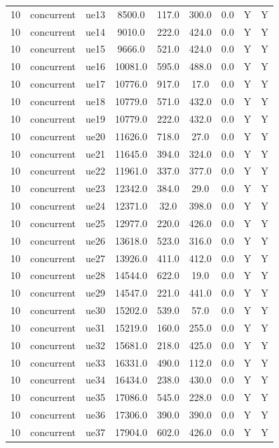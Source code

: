 \begin{table}[ht]
\begin{tabular}{|c|c|c|c|c|c|c|c|c|}
10 & concurrent & ue13 & 8500.0 & 117.0 & 300.0 & 0.0 & Y & Y \\
10 & concurrent & ue14 & 9010.0 & 222.0 & 424.0 & 0.0 & Y & Y \\
10 & concurrent & ue15 & 9666.0 & 521.0 & 424.0 & 0.0 & Y & Y \\
10 & concurrent & ue16 & 10081.0 & 595.0 & 488.0 & 0.0 & Y & Y \\
10 & concurrent & ue17 & 10776.0 & 917.0 & 17.0 & 0.0 & Y & Y \\
10 & concurrent & ue18 & 10779.0 & 571.0 & 432.0 & 0.0 & Y & Y \\
10 & concurrent & ue19 & 10779.0 & 222.0 & 432.0 & 0.0 & Y & Y \\
10 & concurrent & ue20 & 11626.0 & 718.0 & 27.0 & 0.0 & Y & Y \\
10 & concurrent & ue21 & 11645.0 & 394.0 & 324.0 & 0.0 & Y & Y \\
10 & concurrent & ue22 & 11961.0 & 337.0 & 377.0 & 0.0 & Y & Y \\
10 & concurrent & ue23 & 12342.0 & 384.0 & 29.0 & 0.0 & Y & Y \\
10 & concurrent & ue24 & 12371.0 & 32.0 & 398.0 & 0.0 & Y & Y \\
10 & concurrent & ue25 & 12977.0 & 220.0 & 426.0 & 0.0 & Y & Y \\
10 & concurrent & ue26 & 13618.0 & 523.0 & 316.0 & 0.0 & Y & Y \\
10 & concurrent & ue27 & 13926.0 & 411.0 & 412.0 & 0.0 & Y & Y \\
10 & concurrent & ue28 & 14544.0 & 622.0 & 19.0 & 0.0 & Y & Y \\
10 & concurrent & ue29 & 14547.0 & 221.0 & 441.0 & 0.0 & Y & Y \\
10 & concurrent & ue30 & 15202.0 & 539.0 & 57.0 & 0.0 & Y & Y \\
10 & concurrent & ue31 & 15219.0 & 160.0 & 255.0 & 0.0 & Y & Y \\
10 & concurrent & ue32 & 15681.0 & 218.0 & 425.0 & 0.0 & Y & Y \\
10 & concurrent & ue33 & 16331.0 & 490.0 & 112.0 & 0.0 & Y & Y \\
10 & concurrent & ue34 & 16434.0 & 238.0 & 430.0 & 0.0 & Y & Y \\
10 & concurrent & ue35 & 17086.0 & 545.0 & 228.0 & 0.0 & Y & Y \\
10 & concurrent & ue36 & 17306.0 & 390.0 & 390.0 & 0.0 & Y & Y \\
10 & concurrent & ue37 & 17904.0 & 602.0 & 426.0 & 0.0 & Y & Y \\

\end{tabular}
\end{table}
